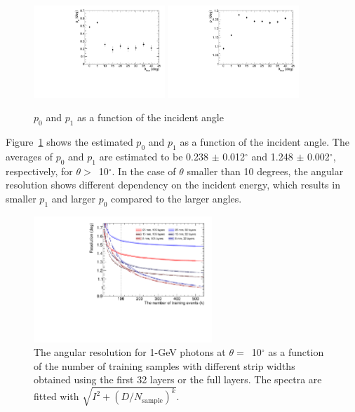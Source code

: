 \documentclass[12pt,times,draftclsnofoot,a4paper]{elsarticle}
\begin{document}
\begin{figure}[!hbt]
\centering
\includegraphics[width=0.44\textwidth]{Fig7_p0.pdf}
\includegraphics[width=0.44\textwidth]{Fig7_p1.pdf}
\caption{ $p_{0}$ and $p_{1}$ as a function of the incident angle }
\label{fig:res_edep}
\end{figure}

Figure~\ref{fig:res_edep} shows the estimated $p_{0}$ and $p_{1}$ as a function of the incident angle. The averages of $p_{0}$ and $p_{1}$ are estimated to be 0.238 $\pm$ 0.012$^{\circ}$ and 1.248 $\pm$ 0.002$^{\circ}$, respectively, for $\theta>$~10$^{\circ}$. In the case of $\theta$ smaller than 10 degrees, the angular resolution shows different dependency on the incident energy, which results in smaller $p_{1}$ and larger $p_{0}$ compared to the larger angles.

\begin{figure}[!hbt]
\centering
\includegraphics[width=0.6\textwidth]{Fig8_nsample_400k_500k.pdf}
\caption{ The angular resolution for 1-GeV photons at $\theta=$~10$^{\circ}$ as a function of the number of training samples with different strip widths obtained using the first 32 layers or the full layers. The spectra are fitted with $\sqrt{I^{2} + (D/N_{\mathrm{sample}})^{k}}$.}
\label{fig:multi-parameter}
\end{figure}
\end{document}
